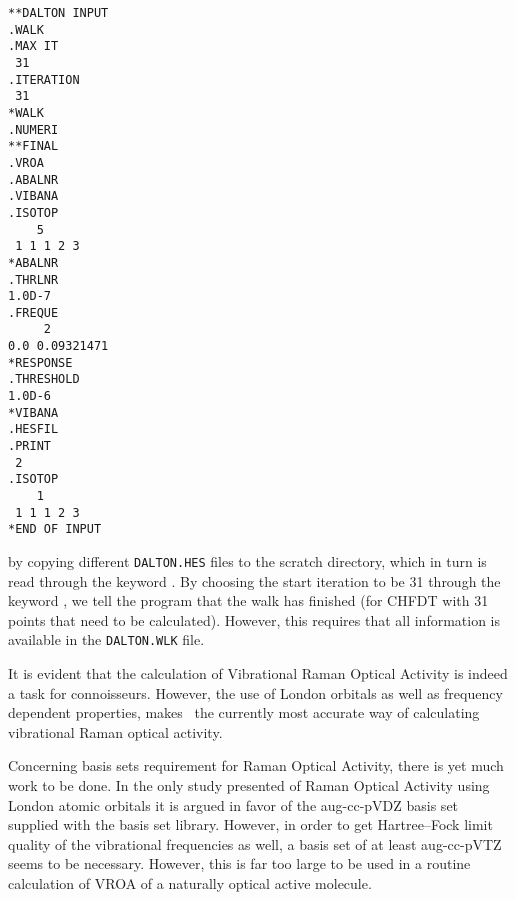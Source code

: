 \begin{verbatim}
**DALTON INPUT
.WALK
.MAX IT
 31
.ITERATION
 31
*WALK
.NUMERI
**FINAL
.VROA
.ABALNR
.VIBANA
.ISOTOP
    5
 1 1 1 2 3
*ABALNR
.THRLNR
1.0D-7
.FREQUE
     2
0.0 0.09321471
*RESPONSE
.THRESHOLD
1.0D-6
*VIBANA
.HESFIL
.PRINT
 2
.ISOTOP
    1
 1 1 1 2 3
*END OF INPUT
\end{verbatim}
by copying different \verb|DALTON.HES| files to the scratch
directory, which in turn is read through the keyword . By
choosing the start iteration to be 31 through the keyword
, we tell the program that the walk has finished (for
CHFDT with 31 points that need to be calculated). However, this
requires that all information is available in the \verb|DALTON.WLK|
file.

It is evident that the calculation of Vibrational Raman Optical
Activity is indeed a task for
connoisseurs. However, the use of London 
orbitals as well as frequency dependent properties, makes \siraba\ the
currently most accurate way of calculating vibrational Raman optical activity. 

Concerning basis sets requirement for Raman Optical Activity, 
there is yet much work to be done. In the only study
presented of Raman Optical Activity using London atomic orbitals it is
argued in favor of the aug-cc-pVDZ basis set supplied with the basis
set library. However, in order to get Hartree--Fock limit quality of
the vibrational frequencies as well, a basis set of at least
aug-cc-pVTZ seems to be necessary. However, this is far too large to
be used in a routine calculation of VROA of a naturally optical active molecule.
